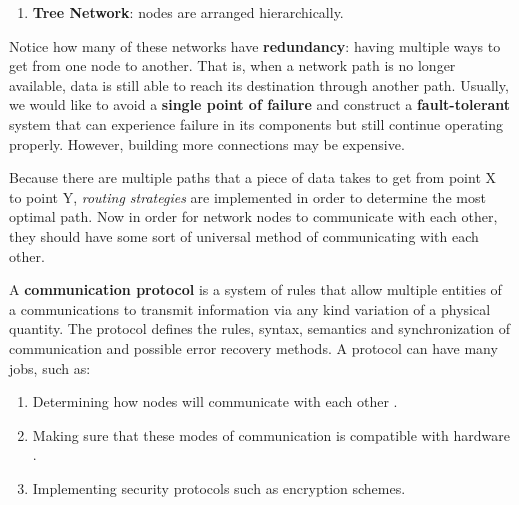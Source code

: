 \documentclass{article}
\newcounter{definition}[section]
\newcounter{example}[section]
\begin{document}
\begin{example}
\begin{enumerate}
        \item \textbf{Tree Network}: nodes are arranged hierarchically.
          \begin{center}
          \end{center}
      \end{enumerate} 
    \end{example}

    Notice how many of these networks have \textbf{redundancy}: having multiple ways to get from one node to another. That is, when a network path is no longer available, data is still able to reach its destination through another path. Usually, we would like to avoid a \textbf{single point of failure} and construct a \textbf{fault-tolerant} system that can experience failure in its components but still continue operating properly. However, building more connections may be expensive. 

    Because there are multiple paths that a piece of data takes to get from point X to point Y, \textit{routing strategies} are implemented in order to determine the most optimal path. Now in order for network nodes to communicate with each other, they should have some sort of universal method of communicating with each other. 

    \begin{definition}
      \label{def:communication-protocol}
      A \textbf{communication protocol} is a system of rules that allow multiple entities of a communications to transmit information via any kind variation of a physical quantity. The protocol defines the rules, syntax, semantics and synchronization of communication and possible error recovery methods. A protocol can have many jobs, such as: 
      
      \begin{enumerate} 
        \item Determining how nodes will communicate with each other . 
        \item Making sure that these modes of communication is compatible with hardware .
        \item Implementing security protocols such as encryption schemes. 
      \end{enumerate}
    \end{definition}
\end{document}
